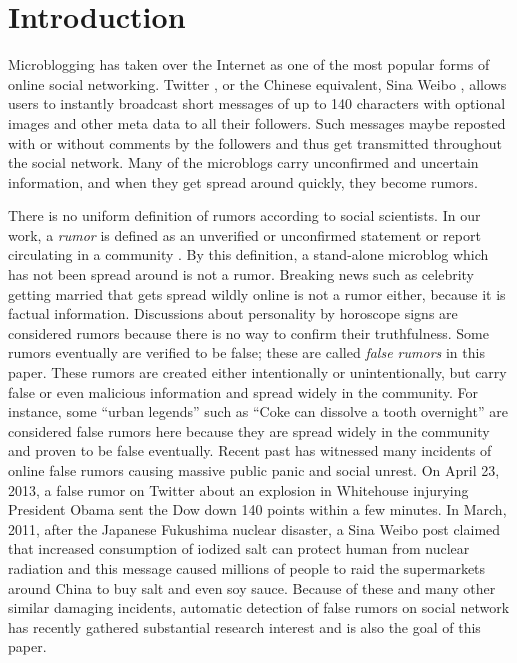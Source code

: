 \section{Introduction}
\label{sec:intro}
Microblogging has taken over the Internet as one of the most
popular forms of online social networking.
Twitter \cite{website:Twitter},
or the Chinese equivalent,
Sina Weibo \cite{website:Sina}, allows users
to instantly broadcast short messages of up to 140 characters
with optional images and other meta data to all their followers.
Such messages maybe reposted with or without
comments by the followers and thus get transmitted throughout the social network.
Many of the microblogs carry unconfirmed and uncertain information,
and when they get spread around quickly,
they become rumors.

There is no uniform definition of rumors according to social scientists.
In our work, a {\em rumor} is defined as an unverified or unconfirmed statement or
report circulating in a community \cite{website:OxfordDic}.
By this definition, a stand-alone microblog which has
not been spread around is not a rumor.
Breaking news such as celebrity getting married that gets spread wildly online
is not a rumor either, because it is factual information.
Discussions about personality by horoscope signs
are considered rumors because there is no way to confirm their
truthfulness. Some rumors eventually are verified to be false;
these are called {\em false rumors} in this paper.
These rumors are created either intentionally or unintentionally,
but carry false or even malicious information and spread widely
in the community. For instance, some ``urban legends'' such as
``Coke can dissolve a tooth overnight'' are considered
false rumors here because they are spread widely in the community
and proven to be false eventually.
Recent past has witnessed many incidents of
online false rumors causing massive public panic and social unrest.
On April 23, 2013, a false rumor on Twitter about an explosion in
Whitehouse injurying President Obama sent the Dow down
140 points within a few minutes.
In March, 2011, after the Japanese Fukushima nuclear disaster, a
Sina Weibo post claimed that increased consumption of iodized salt
can protect human from
nuclear radiation and this message caused millions of
people to raid the supermarkets around China to buy salt
and even soy sauce.
Because of these and many other similar damaging incidents,
automatic detection of false rumors on social network has
recently gathered substantial research interest and
is also the goal of this paper.


